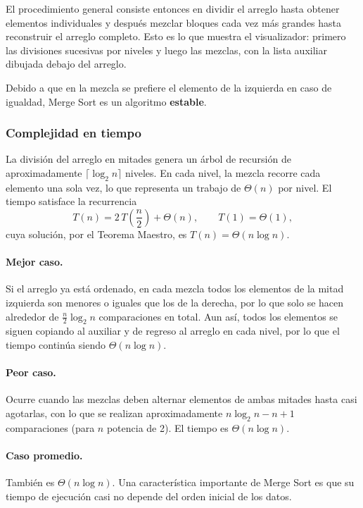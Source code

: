\documentclass[11pt,letterpaper]{article}
\begin{document}
El procedimiento general consiste entonces en dividir el arreglo hasta obtener elementos individuales y después mezclar bloques cada vez más grandes hasta reconstruir el arreglo completo. Esto es lo que muestra el visualizador: primero las divisiones sucesivas por niveles y luego las mezclas, con la lista auxiliar dibujada debajo del arreglo.

Debido a que en la mezcla se prefiere el elemento de la izquierda en caso de igualdad, Merge Sort es un algoritmo \textbf{estable}.

\subsubsection{Complejidad en tiempo}

La división del arreglo en mitades genera un árbol de recursión de aproximadamente $\lceil \log_2 n \rceil$ niveles. En cada nivel, la mezcla recorre cada elemento una sola vez, lo que representa un trabajo de $\Theta(n)$ por nivel. El tiempo satisface la recurrencia
\[
  T(n) = 2\,T\!\left(\frac{n}{2}\right) + \Theta(n), \qquad T(1) = \Theta(1),
\]
cuya solución, por el Teorema Maestro, es $T(n) = \Theta(n \log n)$.

\paragraph{Mejor caso.} Si el arreglo ya está ordenado, en cada mezcla todos los elementos de la mitad izquierda son menores o iguales que los de la derecha, por lo que solo se hacen alrededor de $\frac{n}{2}\log_2 n$ comparaciones en total. Aun así, todos los elementos se siguen copiando al auxiliar y de regreso al arreglo en cada nivel, por lo que el tiempo continúa siendo $\Theta(n \log n)$.

\paragraph{Peor caso.} Ocurre cuando las mezclas deben alternar elementos de ambas mitades hasta casi agotarlas, con lo que se realizan aproximadamente $n\log_2 n - n + 1$ comparaciones (para $n$ potencia de 2). El tiempo es $\Theta(n \log n)$.

\paragraph{Caso promedio.} También es $\Theta(n \log n)$. Una característica importante de Merge Sort es que su tiempo de ejecución casi no depende del orden inicial de los datos.
\end{document}
